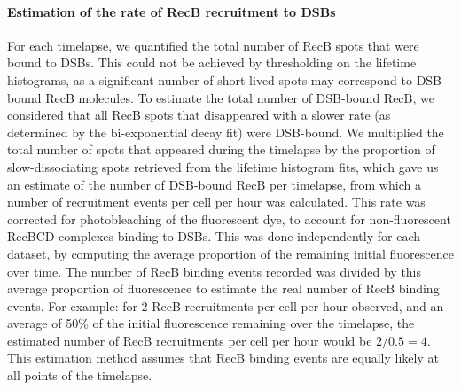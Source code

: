 \paragraph*{Estimation of the rate of RecB recruitment to DSBs}
For each timelapse, we quantified the total number of RecB spots that were bound to DSBs. This could not be achieved by thresholding on the lifetime histograms, as a significant number of short-lived spots may correspond to DSB-bound RecB molecules. To estimate the total number of DSB-bound RecB, we considered that all RecB spots that disappeared with a slower rate (as determined by the bi-exponential decay fit) were DSB-bound. We multiplied the total number of spots that appeared during the timelapse by the proportion of slow-dissociating spots retrieved from the lifetime histogram fits, which gave us an estimate of the number of DSB-bound RecB per timelapse, from which a number of recruitment events per cell per hour was calculated. This rate was corrected for photobleaching of the fluorescent dye, to account for non-fluorescent RecBCD complexes binding to DSBs. This was done independently for each dataset, by computing the average proportion of the remaining initial fluorescence over time. The number of RecB binding events recorded was divided by this average proportion of fluorescence to estimate the real number of RecB binding events. For example: for 2 RecB recruitments per cell per hour observed, and an average of 50\% of the initial fluorescence remaining over the timelapse, the estimated number of RecB recruitments per cell per hour would be $2/0.5 = 4$. This estimation method assumes that RecB binding events are equally likely at all points of the timelapse.

